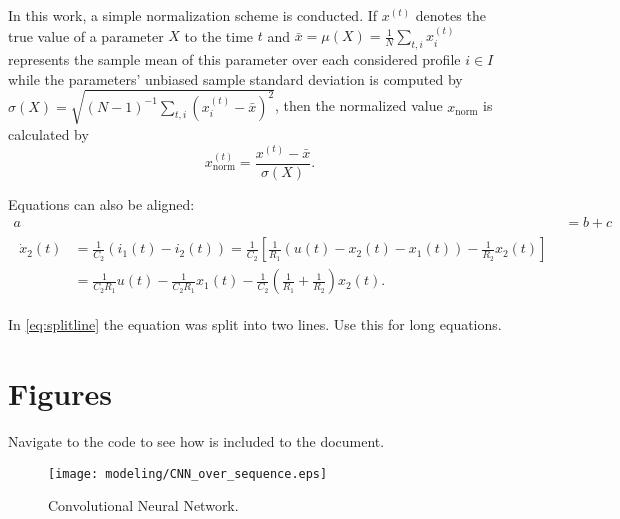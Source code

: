 In this work, a simple normalization scheme is conducted.
If $x^{(t)}$ denotes the true value of a parameter $X$ to the time $t$ and $\bar{x} = \mu(X) = \frac{1}{N}\sum\nolimits_{t, i} x^{(t)}_i$ represents the sample mean of this parameter over each considered profile $i\in I$ while the parameters' unbiased sample standard deviation is computed by $\sigma(X)=\sqrt{(N-1)^{-1}\sum\nolimits_{t, i} (x^{(t)}_i - \bar{x})^2}$, then the normalized value $x_\text{norm}$ is calculated by  
\begin{equation}
	x_\text{norm}^{(t)} = \frac{x^{(t)}-\bar{x}}{\sigma(X)}.
\end{equation}

Equations can also be aligned:
\begin{align}
    a&=b+c\\
    \begin{split}
        \dot{x}_2(t)&= \frac{1}{C_2} \left( i_1(t)-i_2(t)\right)= \frac{1}{C_2} \left[ \frac{1}{R_1} \left(u(t)-x_2(t)-x_1(t) \right)-\frac{1}{R_2} x_2(t)\right]\\
        &= \frac{1}{C_2 R_1} u(t)-\frac{1}{C_2 R_1} x_1(t) - \frac{1}{C_2} \left( \frac{1}{R_1}+\frac{1}{R_2}\right) x_2(t). 
        \label{eq:splitline}
    \end{split}
\end{align}

In \eqref{eq:splitline} the equation was split into two lines. Use this for long equations.

\section{Figures}
\label{sec:architecture}
Navigate to the code to see how  is included to the document. 

\begin{figure}[htb]
	\centering
    \texttt{[image: modeling/CNN\_over\_sequence.eps]}
    \caption{Convolutional Neural Network.}
	\label{fig:cnn}
\end{figure}


